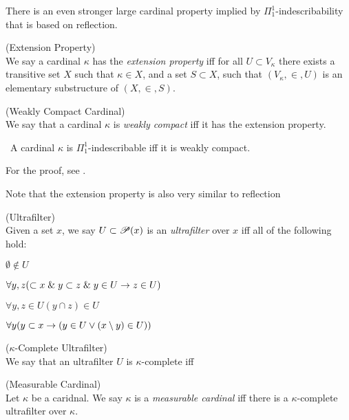 There is an even stronger large cardinal property implied by $\Pi_1^1$-indescribability that is based on reflection.

\begin{definition}{(Extension Property)}\label{def:extension_property}\\
We say a cardinal $\kappa$ has the \emph{extension property} iff for all $U \subset V_\kappa$ there exists a transitive set $X$ such that $\kappa \in X$, and a set $S \subset X$, such that $(V_\kappa, \in, U)$ is an elementary substructure of $(X, \in, S)$.
\end{definition}

\begin{definition}{(Weakly Compact Cardinal)}\label{def:weakly_compact_cardinal}\\
We say that a cardinal $\kappa$ is \emph{weakly compact} iff it has the extension property.
\end{definition}

\begin{theorem}\
A cardinal $\kappa$ is $\Pi_1^1$-indescribable iff it is weakly compact.
\end{theorem}
For the proof, see \cite{KanamoriBook}. %

Note that the extension property is also very similar to reflection

\begin{definition}{(Ultrafilter)}\\
Given a set $x$, we say $U \subset \mathscr{P} (x)$ is an \emph{ultrafilter} over $x$ iff all of the following hold:
\bce[(i)]
\item $\emptyset \not\in U$
\item $\forall y, z (\subset x \mathrel{\&} y \subset z \mathrel{\&} y \in U \rightarrow z \in U)$
\item $\forall y, z \in U (y \cap z) \in U$
\item $\forall y (y \subset x \rightarrow (y \in U \lor (x \setminus y) \in U))$
\ece
\end{definition}

\begin{definition}{($\kappa$-Complete Ultrafilter)}\\
We say that an ultrafilter $U$ is $\kappa$-complete iff
\end{definition}

\begin{definition}{(Measurable Cardinal)}\\
Let $\kappa$ be a caridnal. We say $\kappa$ is a \emph{measurable cardinal} iff there is a $\kappa$-complete ultrafilter over $\kappa$.
\end{definition}

